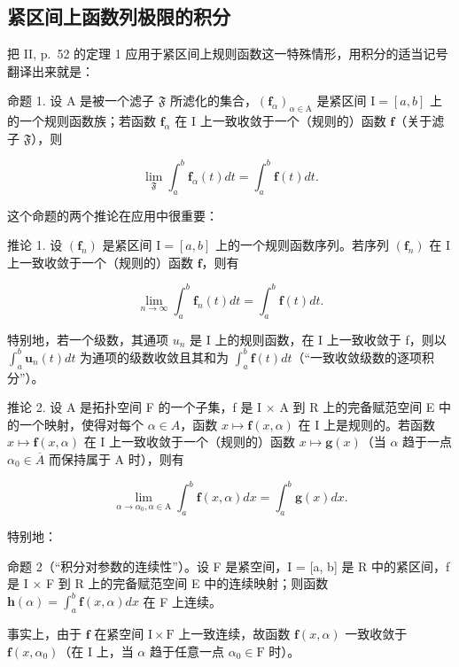 \subsection{紧区间上函数列极限的积分}

把 II, p.~52 的定理 1 应用于紧区间上规则函数这一特殊情形，用积分的适当记号翻译出来就是：

命题 1. 设 A 是被一个滤子 \(\mathfrak{F}\) 所滤化的集合，\((\mathbf{f}_{\alpha})_{\alpha \in \mathrm{A}}\) 是紧区间 \(\mathrm{I} = [a, b]\) 上的一个规则函数族；若函数 \(\mathbf{f}_{\alpha}\) 在 I 上一致收敛于一个（规则的）函数 \(\mathbf{f}\)（关于滤子 \(\mathfrak{F}\)），则

\[
\lim _ {\mathfrak {F}} \int_ {a} ^ {b} \mathbf {f} _ {\alpha} (t) d t = \int_ {a} ^ {b} \mathbf {f} (t) d t.\tag{1}
\]

这个命题的两个推论在应用中很重要：

推论 1. 设 \((\mathbf{f}_n)\) 是紧区间 \(\mathrm{I} = [a, b]\) 上的一个规则函数序列。若序列 \((\mathbf{f}_n)\) 在 \(\mathrm{I}\) 上一致收敛于一个（规则的）函数 \(\mathbf{f}\)，则有

\[
\lim _ {n \rightarrow \infty} \int_ {a} ^ {b} \mathbf {f} _ {n} (t) d t = \int_ {a} ^ {b} \mathbf {f} (t) d t.\tag{2}
\]

特别地，若一个级数，其通项 \(u_{n}\) 是 I 上的规则函数，在 I 上一致收敛于 f，则以 \(\int_{a}^{b}\mathbf{u}_{n}(t)dt\) 为通项的级数收敛且其和为 \(\int_{a}^{b}\mathbf{f}(t)dt\)（“一致收敛级数的逐项积分”）。

推论 2. 设 A 是拓扑空间 F 的一个子集，f 是 I × A 到 R 上的完备赋范空间 E 中的一个映射，使得对每个 \(\alpha \in A\)，函数 \(x \mapsto \mathbf{f}(x, \alpha)\) 在 I 上是规则的。若函数 \(x \mapsto \mathbf{f}(x, \alpha)\) 在 I 上一致收敛于一个（规则的）函数 \(x \mapsto \mathbf{g}(x)\)（当 \(\alpha\) 趋于一点 \(\alpha_{0} \in \overline{A}\) 而保持属于 A 时），则有

\[
\lim _ {\alpha \rightarrow \alpha_ {0}, \alpha \in \mathrm{A}} \int_ {a} ^ {b} \mathbf {f} (x, \alpha) d x = \int_ {a} ^ {b} \mathbf {g} (x) d x.\tag{3}
\]

特别地：

命题 2（“积分对参数的连续性”）。设 F 是紧空间，I = {[}a, b{]} 是 R 中的紧区间，f 是 I × F 到 R 上的完备赋范空间 E 中的连续映射；则函数 \(\mathbf{h}(\alpha) = \int_{a}^{b} \mathbf{f}(x, \alpha) dx\) 在 F 上连续。

事实上，由于 \(\mathbf{f}\) 在紧空间 \(\mathrm{I} \times \mathrm{F}\) 上一致连续，故函数 \(\mathbf{f}(x, \alpha)\) 一致收敛于 \(\mathbf{f}(x, \alpha_0)\)（在 \(\mathrm{I}\) 上，当 \(\alpha\) 趋于任意一点 \(\alpha_0 \in \mathrm{F}\) 时）。

